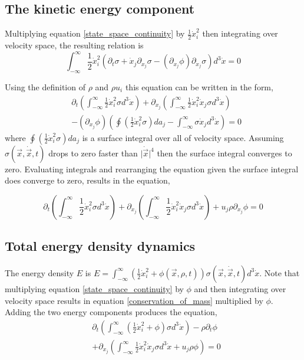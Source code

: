 \documentclass[%
 twocolumn,
 amsmath,amssymb,
 aps,
]{revtex4-1}
\newcommand{\dvec}[1]{\dot{\vec{#1}}}
\newcommand{\intVdot}[1]{\int_{-\infty}^{\infty} #1 d^3\dot{x}}
\begin{document}
\subsection{The kinetic energy component}
Multiplying equation \eqref{state_space_continuity} by $\frac{1}{2}\dot{x}_i^2$ then integrating over velocity space, the resulting relation is
\[
\intVdot{\frac{1}{2}\dot{x}_i^2\left(\partial_t \sigma + \dot{x}_j\partial_{x_j}\sigma-\left(\partial_{x_j}\phi\right)\partial_{\dot{x}_j}\sigma\right)}=0
\]

Using the definition of $\rho$ and $\rho u_i$ this equation can be written in the form,
\[
\begin{split}
& \partial_t\left(\intVdot{\frac{1}{2}\dot{x}_i^2\sigma}\right) + \partial_{x_j}\left(\intVdot{\frac{1}{2}\dot{x}_i^2\dot{x}_j\sigma}\right) \\ & -  \left(\partial_{x_j}\phi\right)\left(\oint\left(\frac{1}{2}\dot{x}_i^2\sigma\right)da_j - \intVdot{\sigma\dot{x}_j}\right)=0
\end{split}
\]
where $\oint\left(\frac{1}{2}\dot{x}_i^2\sigma\right)da_j$ is a surface integral over all of velocity space. Assuming $\sigma(\vec{x}, \dvec{x}, t)$ drops to zero faster than $\lvert\dvec{x}\rvert^4$ then the surface integral converges to zero. Evaluating integrals and rearranging the equation given the surface integral does converge to zero, results in the equation,

\begin{equation}
\partial_t\left(\intVdot{\frac{1}{2}\dot{x}_i^2\sigma}\right) + \partial_{x_j}\left(\intVdot{\frac{1}{2}\dot{x}_i^2\dot{x}_j\sigma}\right) + u_j\rho\partial_{x_j}\phi=0
\label{incomplete_conservation_of_energy_kinetic}
\end{equation}

\subsection{Total energy density dynamics}
The energy density $E$ is $E=\intVdot{\left(\frac{1}{2}\dot{x}_i^2 + \phi(\vec{x}, \rho, t)\right)\sigma(\vec{x}, \dvec{x}, t)}$. Note that multiplying equation \eqref{state_space_continuity} by $\phi$ and then integrating over velocity space results in equation \eqref{conservation_of_mass} multiplied by $\phi$. Adding the two energy components produces the equation,
\[
\begin{split}
& \partial_t\left(\intVdot{\left(\frac{1}{2}\dot{x}_i^2 + \phi\right)\sigma}\right) - \rho\partial_t\phi \\& + \partial_{x_j}\left(\intVdot{\frac{1}{2}\dot{x}_i^2\dot{x}_j\sigma} + u_j\rho\phi\right)=0
\end{split}
\]
\end{document}
